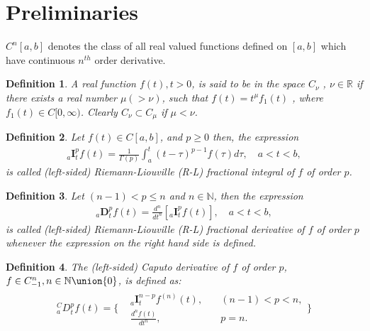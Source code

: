 \documentclass[pdflatex,sn-mathphys]{sn-jnl}%
\theoremstyle{thmstyleone}%
\theoremstyle{thmstyletwo}%
\theoremstyle{thmstylethree}%
\newtheorem{definition}{Definition}%
\begin{document}
\section{Preliminaries}\label{Preliminaries}

$C^n[a, b]$  denotes the class of all real valued functions defined on $[a, b]$ which have continuous $n^{th}$ order derivative.

\begin{definition}\cite{dimovski1982convolutional,luchko1999operational}
A real function $f(t), t > 0$, is said to be in the space $C_\nu$ , $ \nu \in \mathbb{R}$ if there
exists a real number $\mu (> \nu)$, such that $f(t) = t^\mu f_1(t)$ , where $f_1(t)\in C[0, \infty)$. Clearly $C_\nu \subset C_\mu$ if $\mu <\nu$.
\end{definition}

\begin{definition}\cite{podlubny1998fractional,kilbas2006theory}
Let $f(t) \in C[a,b]$, and $p \geqslant 0$ then, the expression
 \begin{align}
{ }_{a}\mathbf{I}_{t}^{p} f(t)=\frac{1}{\Gamma(p)} \int_{a}^{t}(t-\tau)^{p-1} f(\tau) d \tau, \quad a<t<b,\label{RL D defi}
\end{align}
is called (left-sided) Riemann-Liouville (R-L) fractional integral of $f$ of order  $p$.
\end{definition}

\begin{definition}\cite{podlubny1998fractional,kilbas2006theory}
Let $(n-1)< p \leqslant n$ and $n \in \mathbb{N} $, then the expression 
 \begin{align}
{ }_{a}\mathbf{D}_{t}^{p} f(t)=\frac{d^{n}}{d t^{n}} [{ }_{a}\mathbf{I}_{t}^{p} f(t)], \quad a<t<b,\label{RL D defi}
\end{align}
is called (left-sided) Riemann-Liouville (R-L) fractional derivative of $f$ of order  $p$ whenever the expression on the right hand side is defined.
\end{definition}

\begin{definition}\cite{podlubny1998fractional,kilbas2006theory}
The (left-sided) Caputo derivative of $f$ of order $p$, $f \in C^{n}_{-1}, n\in \mathbb{N} \union \{0\}$, is defined as:
\begin{align}
{ }_{a}^{C} D_{t}^{p} f(t)= 
\Biggl\{ \begin{array}{ccc}
 &{ }_{a}\mathbf{I}_{t}^{n-p} f^{(n)}(t), \quad &(n-1)<p<n,  \\
 &\frac{d^nf(t)}{dt^n}, & p=n.
\end{array}
\Biggl\}
\end{align}
\end{definition}
\end{document}
